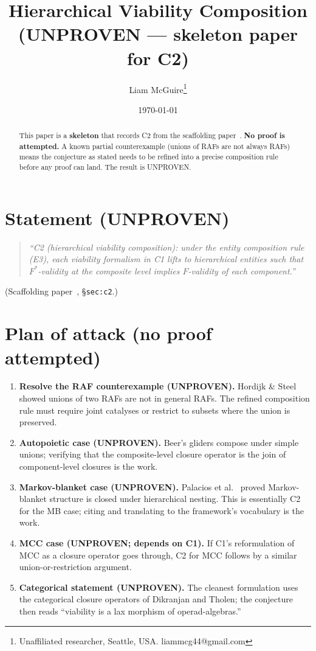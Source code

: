 \documentclass[11pt]{article}
\title{Hierarchical Viability Composition \\
       \large (UNPROVEN --- skeleton paper for C2)}
\author{Liam McGuire\thanks{Unaffiliated researcher, Seattle, USA. liammcg44@gmail.com}}
\date{\today}
\theoremstyle{plain}
\theoremstyle{definition}
\begin{document}
\maketitle

\begin{abstract}
This paper is a \textbf{skeleton} that records C2 from the scaffolding
paper~\cite{emergent_systems_2026}. \textbf{No proof is attempted.}
A known partial counterexample (unions of RAFs are not always RAFs)
means the conjecture as stated needs to be refined into a precise
composition rule before any proof can land. The result is UNPROVEN.
\end{abstract}

\section{Statement (UNPROVEN)}

\begin{quote}
\emph{``C2 (hierarchical viability composition): under the entity
composition rule (E3), each viability formalism in C1 lifts to
hierarchical entities such that $F^*$-validity at the composite level
implies $F$-validity of each component.''}
\end{quote}
\noindent (Scaffolding paper~\cite{emergent_systems_2026},
\S\texttt{sec:c2}.)

\section{Plan of attack (no proof attempted)}

\begin{enumerate}[leftmargin=2em,itemsep=4pt]
  \item \textbf{Resolve the RAF counterexample (UNPROVEN).} Hordijk
    \& Steel~\cite{hordijk2004raf} showed unions of two RAFs are not
    in general RAFs. The refined composition rule must require joint
    catalyses or restrict to subsets where the union is preserved.
  \item \textbf{Autopoietic case (UNPROVEN).} Beer's gliders compose
    under simple unions; verifying that the composite-level closure
    operator is the join of component-level closures is the work.
  \item \textbf{Markov-blanket case (UNPROVEN).} Palacios et
    al.~\cite{palacios2020markov} proved Markov-blanket structure is
    closed under hierarchical nesting. This is essentially C2 for
    the MB case; citing and translating to the framework's vocabulary
    is the work.
  \item \textbf{MCC case (UNPROVEN; depends on C1).} If C1's
    reformulation of MCC as a closure operator goes through, C2 for
    MCC follows by a similar union-or-restriction argument.
  \item \textbf{Categorical statement (UNPROVEN).} The cleanest
    formulation uses the categorical closure operators of
    Dikranjan and Tholen; the conjecture then reads ``viability is
    a lax morphism of operad-algebras.''
\end{enumerate}
\end{document}
